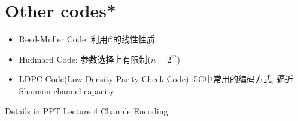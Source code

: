 \section{Other codes*}
\begin{itemize}
\item Reed-Muller Code: 利用$\mathcal{C}$的线性性质.
\item Hudmard Code: 参数选择上有限制($n=2^m$)
\item LDPC Code(Low-Density Parity-Check Code) :5G中常用的编码方式, 逼近Shannon channel capacity
\end{itemize}
Details in PPT Lecture 4 Channle Encoding.